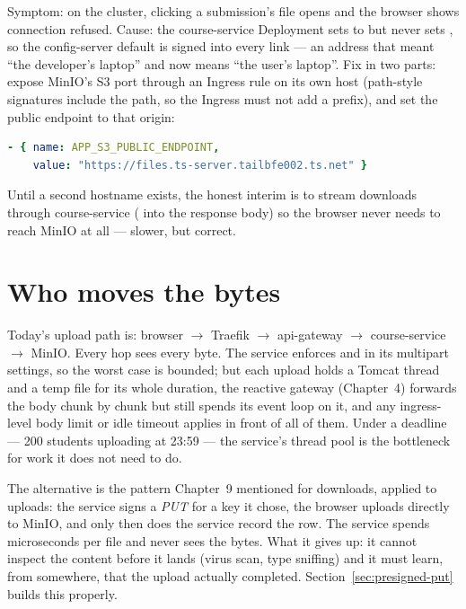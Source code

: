 \begin{pitfall}
Symptom: on the cluster, clicking a submission's file opens
 and the browser shows connection
refused. Cause: the course-service Deployment sets
 to  but never sets
, so the config-server default
 is signed into every link --- an address
that meant ``the developer's laptop'' and now means ``the user's
laptop''. Fix in two parts: expose MinIO's S3 port through an Ingress
rule on its own host (path-style signatures include the path, so the
Ingress must not add a prefix), and set the public endpoint to that
origin:
\begin{lstlisting}[language=yaml]
- { name: APP_S3_PUBLIC_ENDPOINT,
    value: "https://files.ts-server.tailbfe002.ts.net" }
\end{lstlisting}
Until a second hostname exists, the honest interim is to stream
downloads through course-service ( into the response
body) so the browser never needs to reach MinIO at all --- slower, but
correct.
\end{pitfall}

\section{Who moves the bytes}

Today's upload path is: browser $\rightarrow$ Traefik $\rightarrow$
api-gateway $\rightarrow$ course-service $\rightarrow$ MinIO. Every hop
sees every byte. The service enforces  and
 in its multipart settings, so the worst
case is bounded; but each upload holds a Tomcat thread and a temp file
for its whole duration, the reactive gateway (Chapter~4) forwards the
body chunk by chunk but still spends its event loop on it, and any
ingress-level body limit or idle timeout applies in front of all of
them. Under a deadline --- 200 students uploading at 23:59 --- the
service's thread pool is the bottleneck for work it does not need to do.

The alternative is the pattern Chapter~9 mentioned for downloads,
applied to uploads: the service signs a \emph{PUT} for a key it chose,
the browser uploads directly to MinIO, and only then does the service
record the row. The service spends microseconds per file and never sees
the bytes. What it gives up: it cannot inspect the content before it
lands (virus scan, type sniffing) and it must learn, from somewhere, that
the upload actually completed. Section~\ref{sec:presigned-put} builds
this properly.

